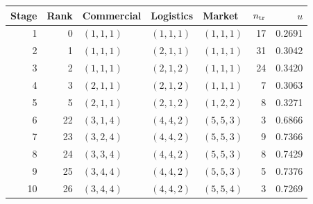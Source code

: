 {\footnotesize\setlength{\tabcolsep}{3pt}
\begin{tabularx}{\linewidth}{@{}rrXXXrr@{}}
\toprule
Stage & Rank & Commercial & Logistics & Market & $n_{\rm tr}$ & $u$\\
\midrule
1 & 0 & $(1,1,1)$ & $(1,1,1)$ & $(1,1,1)$ & 17 & 0.2691\\
2 & 1 & $(1,1,1)$ & $(2,1,1)$ & $(1,1,1)$ & 31 & 0.3042\\
3 & 2 & $(1,1,1)$ & $(2,1,2)$ & $(1,1,1)$ & 24 & 0.3420\\
4 & 3 & $(2,1,1)$ & $(2,1,2)$ & $(1,1,1)$ & 7 & 0.3063\\
5 & 5 & $(2,1,1)$ & $(2,1,2)$ & $(1,2,2)$ & 8 & 0.3271\\
6 & 22 & $(3,1,4)$ & $(4,4,2)$ & $(5,5,3)$ & 3 & 0.6866\\
7 & 23 & $(3,2,4)$ & $(4,4,2)$ & $(5,5,3)$ & 9 & 0.7366\\
8 & 24 & $(3,3,4)$ & $(4,4,2)$ & $(5,5,3)$ & 8 & 0.7429\\
9 & 25 & $(3,4,4)$ & $(4,4,2)$ & $(5,5,3)$ & 5 & 0.7376\\
10 & 26 & $(3,4,4)$ & $(4,4,2)$ & $(5,5,4)$ & 3 & 0.7269\\
\bottomrule
\end{tabularx}}
